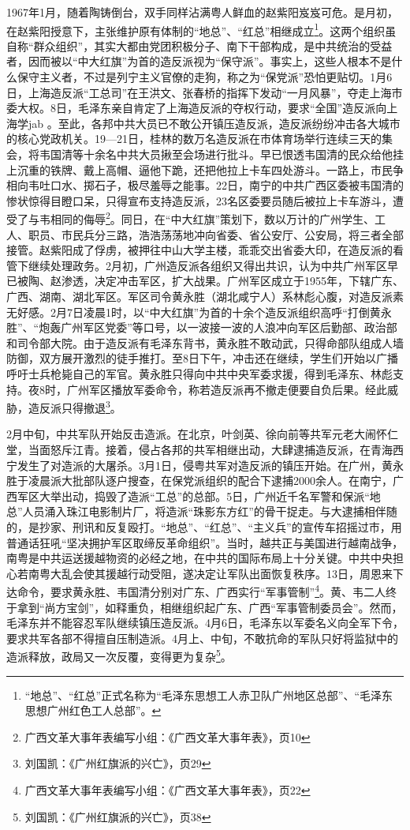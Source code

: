 1967年1月，随着陶铸倒台，双手同样沾满粤人鲜血的赵紫阳岌岌可危。是月初，在赵紫阳授意下，主张维护原有体制的“地总”、“红总”相继成立\footnote{“地总”、“红总”正式名称为“毛泽东思想工人赤卫队广州地区总部”、“毛泽东思想广州红色工人总部”。}。这两个组织虽自称“群众组织”，其实大都由党团积极分子、南下干部构成，是中共统治的受益者，因而被以“中大红旗”为首的造反派视为“保守派”。事实上，这些人根本不是什么保守主义者，不过是列宁主义官僚的走狗，称之为“保党派”恐怕更贴切。1月6日，上海造反派“工总司”在王洪文、张春桥的指挥下发动“一月风暴”，夺走上海市委大权。8日，毛泽东亲自肯定了上海造反派的夺权行动，要求“全国”造反派向上海学jab 。至此，各邦中共大员已不敢公开镇压造反派，造反派纷纷冲击各大城市的核心党政机关。19—21日，桂林的数万名造反派在市体育场举行连续三天的集会，将韦国清等十余名中共大员揪至会场进行批斗。早已恨透韦国清的民众给他挂上沉重的铁牌、戴上高帽、逼他下跪，还把他拉上卡车四处游斗。一路上，市民争相向韦吐口水、掷石子，极尽羞辱之能事。22日，南宁的中共广西区委被韦国清的惨状惊得目瞪口呆，只得宣布支持造反派，23名区委要员随后被拉上卡车游斗，遭受了与韦相同的侮辱\footnote{广西文革大事年表编写小组：《广西文革大事年表》，页10}。同日，在“中大红旗”策划下，数以万计的广州学生、工人、职员、市民兵分三路，浩浩荡荡地冲向省委、省公安厅、公安局，将三者全部接管。赵紫阳成了俘虏，被押往中山大学主楼，乖乖交出省委大印，在造反派的看管下继续处理政务。2月初，广州造反派各组织又得出共识，认为中共广州军区早已被陶、赵渗透，决定冲击军区，扩大战果。广州军区成立于1955年，下辖广东、广西、湖南、湖北军区。军区司令黄永胜（湖北咸宁人）系林彪心腹，对造反派素无好感。2月7日凌晨1时，以“中大红旗”为首的十余个造反派组织高呼“打倒黄永胜”、“炮轰广州军区党委”等口号，以一波接一波的人浪冲向军区后勤部、政治部和司令部大院。由于造反派有毛泽东背书，黄永胜不敢动武，只得命部队组成人墙防御，双方展开激烈的徒手推打。至8日下午，冲击还在继续，学生们开始以广播呼吁士兵枪毙自己的军官。黄永胜只得向中共中央军委求援，得到毛泽东、林彪支持。夜8时，广州军区播放军委命令，称若造反派再不撤走便要自负后果。经此威胁，造反派只得撤退\footnote{刘国凯：《广州红旗派的兴亡》，页29}。

2月中旬，中共军队开始反击造派。在北京，叶剑英、徐向前等共军元老大闹怀仁堂，当面怒斥江青。接着，侵占各邦的共军相继出动，大肆逮捕造反派，在青海西宁发生了对造派的大屠杀。3月1日，侵粤共军对造反派的镇压开始。在广州，黄永胜于凌晨派大批部队逐户搜查，在保党派组织的配合下逮捕2000余人。在南宁，广西军区大举出动，捣毁了造派“工总”的总部。5日，广州近千名军警和保派“地总”人员涌入珠江电影制片厂，将造派“珠影东方红”的骨干捉走。与大逮捕相伴随的，是抄家、刑讯和反复殴打。“地总”、“红总”、“主义兵”的宣传车招摇过市，用普通话狂吼“坚决拥护军区取缔反革命组织”。当时，越共正与美国进行越南战争，南粤是中共运送援越物资的必经之地，在中共的国际布局上十分关键。中共中央担心若南粤大乱会使其援越行动受阻，遂决定让军队出面恢复秩序。13日，周恩来下达命令，要求黄永胜、韦国清分别对广东、广西实行“军事管制”\footnote{广西文革大事年表编写小组：《广西文革大事年表》，页22}。黄、韦二人终于拿到“尚方宝剑”，如释重负，相继组织起广东、广西“军事管制委员会”。然而，毛泽东并不能容忍军队继续镇压造反派。4月6日，毛泽东以军委名义向全军下令，要求共军各部不得擅自压制造派。4月上、中旬，不敢抗命的军队只好将监狱中的造派释放，政局又一次反覆，变得更为复杂\footnote{刘国凯：《广州红旗派的兴亡》，页38}。

